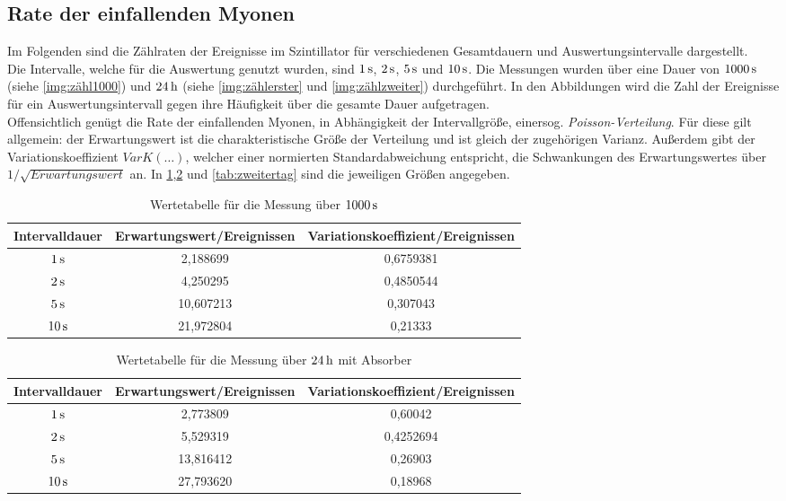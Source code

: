 \documentclass[numbers=noenddot,12pt,a4paper]{scrartcl}
\newcommand{\tilt}[1]{\textit{#1}}
\begin{document}
\subsection{Rate der einfallenden Myonen}
Im Folgenden sind die Zählraten der Ereignisse im Szintillator für verschiedenen Gesamtdauern und Auswertungsintervalle dargestellt.\\
Die Intervalle, welche für die Auswertung genutzt wurden, sind $\unit[1]{s}$, $\unit[2]{s}$, $\unit[5]{s}$ und $\unit[10]{s}$. Die Messungen wurden über eine Dauer von $\unit[1000]{s}$ (siehe \ref{img:zähl1000}) und $\unit[24]{h}$ (siehe \ref{img:zählerster} und \ref{img:zählzweiter}) durchgeführt. In den Abbildungen wird die Zahl der Ereignisse für ein Auswertungsintervall gegen ihre Häufigkeit über die gesamte Dauer aufgetragen.\\
Offensichtlich genügt die Rate der einfallenden Myonen, in Abhängigkeit der Intervallgröße, einersog. \tilt{Poisson-Verteilung}. Für diese gilt allgemein: der Erwartungswert ist die charakteristische Größe der Verteilung und ist gleich der zugehörigen Varianz. Außerdem gibt der Variationskoeffizient $VarK\left(\dots\right)$, welcher einer normierten Standardabweichung entspricht, die Schwankungen des Erwartungswertes über $1/\sqrt{Erwartungswert}$ an. In \ref{tab:1000s},\ref{tab:erstertag} und \ref{tab:zweitertag} sind die jeweiligen Größen angegeben.
\begin{table}[H]
	\centering
	\begin{tabular}{c|c|c}
		Intervalldauer & Erwartungswert/Ereignissen & Variationskoeffizient/Ereignissen \\ \hline
		$\unit[1]{s}$ & 2,188699 & 0,6759381 \\ \hline
		$\unit[2]{s}$ & 4,250295 & 0,4850544 \\ \hline
		$\unit[5]{s}$ & 10,607213 & 0,307043 \\ \hline
		$\unit[10]{s}$ & 21,972804 & 0,21333 
	\end{tabular}
	\caption{Wertetabelle für die Messung über $\unit[1000]{s}$}\label{tab:1000s}
\end{table}
\begin{table}[H]
	\centering
	\begin{tabular}{c|c|c}
		Intervalldauer & Erwartungswert/Ereignissen & Variationskoeffizient/Ereignissen \\ \hline
		$\unit[1]{s}$ & 2,773809 & 0,60042 \\ \hline
		$\unit[2]{s}$ & 5,529319 & 0,4252694 \\ \hline
		$\unit[5]{s}$ & 13,816412 & 0,26903 \\ \hline
		$\unit[10]{s}$ & 27,793620 & 0,18968
	\end{tabular}
	\caption{Wertetabelle für die Messung über $\unit[24]{h}$ mit Absorber}\label{tab:erstertag}
\end{table}
\end{document}
